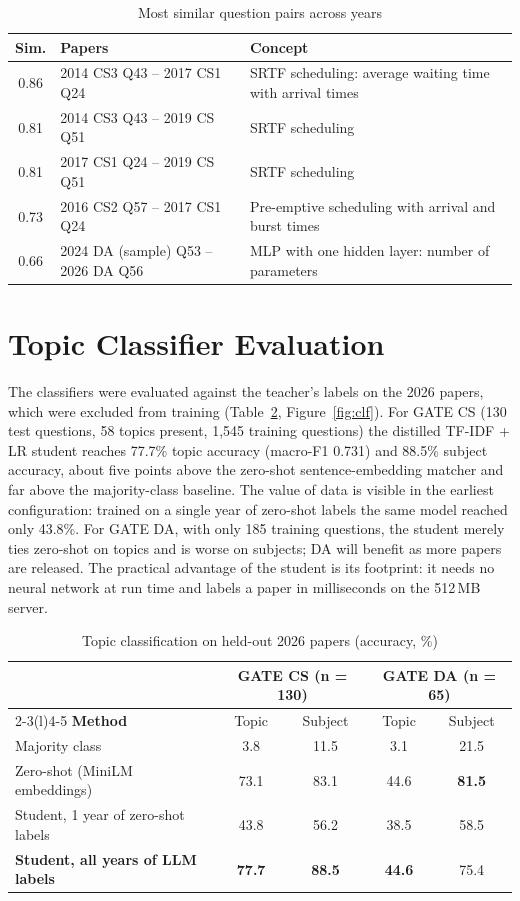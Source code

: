 \begin{table}[h]
\centering
\caption{Most similar question pairs across years}
\label{tab:recur}
\small
\begin{tabularx}{\textwidth}{@{}clX@{}}
\toprule
\textbf{Sim.} & \textbf{Papers} & \textbf{Concept}\\
\midrule
0.86 & 2014 CS3 Q43 -- 2017 CS1 Q24 & SRTF scheduling: average waiting time with arrival times\\
0.81 & 2014 CS3 Q43 -- 2019 CS Q51 & SRTF scheduling\\
0.81 & 2017 CS1 Q24 -- 2019 CS Q51 & SRTF scheduling\\
0.73 & 2016 CS2 Q57 -- 2017 CS1 Q24 & Pre-emptive scheduling with arrival and burst times\\
0.66 & 2024 DA (sample) Q53 -- 2026 DA Q56 & MLP with one hidden layer: number of parameters\\
\bottomrule
\end{tabularx}
\end{table}

\section{Topic Classifier Evaluation}
The classifiers were evaluated against the teacher's labels on the 2026 papers, which were excluded from training
(Table~\ref{tab:clf}, Figure~\ref{fig:clf}). For GATE CS (130 test questions, 58 topics present, 1,545 training
questions) the distilled TF-IDF + LR student reaches 77.7\% topic accuracy (macro-F1 0.731) and 88.5\% subject
accuracy, about five points above the zero-shot sentence-embedding matcher and far above the majority-class baseline.
The value of data is visible in the earliest configuration: trained on a single year of zero-shot labels the same model
reached only 43.8\%. For GATE DA, with only 185 training questions, the student merely ties zero-shot on topics and is
worse on subjects; DA will benefit as more papers are released. The practical advantage of the student is its footprint:
it needs no neural network at run time and labels a paper in milliseconds on the 512\,MB server.

\begin{table}[h]
\centering
\caption{Topic classification on held-out 2026 papers (accuracy, \%)}
\label{tab:clf}
\small
\begin{tabular}{@{}lcccc@{}}
\toprule
& \multicolumn{2}{c}{\textbf{GATE CS} (n = 130)} & \multicolumn{2}{c}{\textbf{GATE DA} (n = 65)}\\
\cmidrule(lr){2-3}\cmidrule(l){4-5}
\textbf{Method} & Topic & Subject & Topic & Subject\\
\midrule
Majority class & 3.8 & 11.5 & 3.1 & 21.5\\
Zero-shot (MiniLM embeddings) & 73.1 & 83.1 & 44.6 & \textbf{81.5}\\
Student, 1 year of zero-shot labels & 43.8 & 56.2 & 38.5 & 58.5\\
\textbf{Student, all years of LLM labels} & \textbf{77.7} & \textbf{88.5} & \textbf{44.6} & 75.4\\
\bottomrule
\end{tabular}
\end{table}

